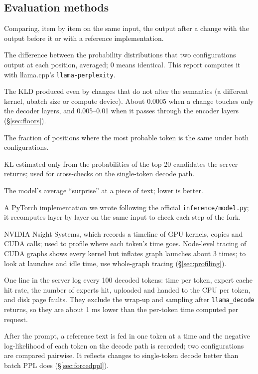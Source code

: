\documentclass[11pt,a4paper]{article}
\newcommand{\code}[1]{\texttt{#1}}
\begin{document}
\subsection*{Evaluation methods}
\begin{description}\small
  \item[Cross-check] Comparing, item by item on the same input, the output after a change with the output before it or with a reference implementation.
  \item[KLD (KL divergence)] The difference between the probability distributions that two configurations output at each position, averaged; 0 means identical. This report computes it with llama.cpp's \code{llama-perplexity}.
  \item[Numerical floor] The KLD produced even by changes that do not alter the semantics (a different kernel, ubatch size or compute device). About 0.0005 when a change touches only the decoder layers, and 0.005--0.01 when it passes through the encoder layers (\S\ref{sec:floors}).
  \item[Top-1 agreement] The fraction of positions where the most probable token is the same under both configurations.
  \item[top-20 KL] KL estimated only from the probabilities of the top 20 candidates the server returns; used for cross-checks on the single-token decode path.
  \item[PPL (perplexity)] The model's average ``surprise'' at a piece of text; lower is better.
  \item[Reference implementation (oracle)] A PyTorch implementation we wrote following the official \code{inference/model.py}; it recomputes layer by layer on the same input to check each step of the fork.
  \item[nsys] NVIDIA Nsight Systems, which records a timeline of GPU kernels, copies and CUDA calls; used to profile where each token's time goes. Node-level tracing of CUDA graphs shows every kernel but inflates graph launches about 3 times; to look at launches and idle time, use whole-graph tracing (\S\ref{sec:profiling}).
  \item[Decode stats (0016)] One line in the server log every 100 decoded tokens: time per token, expert cache hit rate, the number of experts hit, uploaded and handed to the CPU per token, and disk page faults. They exclude the wrap-up and sampling after \code{llama\_decode} returns, so they are about 1 ms lower than the per-token time computed per request.
  \item[Forced-decoding PPL] After the prompt, a reference text is fed in one token at a time and the negative log-likelihood of each token on the decode path is recorded; two configurations are compared pairwise. It reflects changes to single-token decode better than batch PPL does (\S\ref{sec:forcedppl}).

\end{description}
\end{document}
